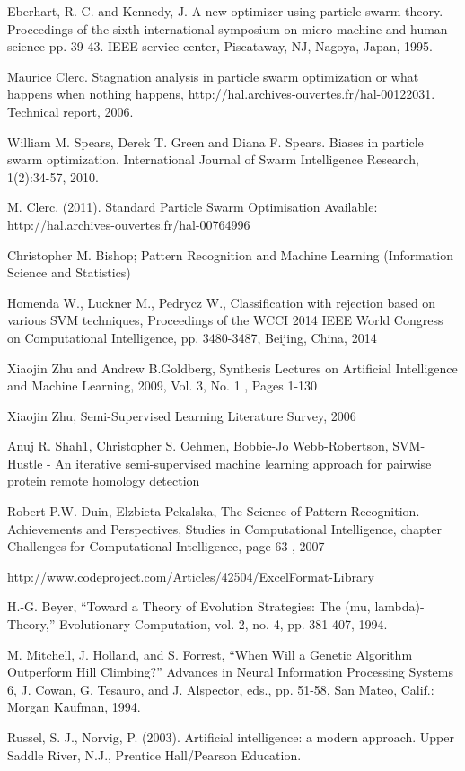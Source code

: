 \documentclass{mini}
\begin{document}
\begin{thebibliography}{1}
    
    Eberhart, R. C. and Kennedy, J. A new optimizer using particle swarm theory. Proceedings of the sixth international symposium on micro machine and human science pp. 39-43. IEEE service center, Piscataway, NJ, Nagoya, Japan, 1995.
    
    Maurice Clerc. Stagnation analysis in particle swarm optimization or what happens when nothing happens, http://hal.archives-ouvertes.fr/hal-00122031. Technical report, 2006.

    William M. Spears, Derek T. Green and Diana F. Spears. Biases in particle swarm optimization. International Journal of Swarm Intelligence Research, 1(2):34-57, 2010.

    M. Clerc. (2011). Standard Particle Swarm Optimisation Available: http://hal.archives-ouvertes.fr/hal-00764996 
    
     Christopher M. Bishop; Pattern Recognition and Machine Learning (Information Science and Statistics)
    
	 Homenda W., Luckner M., Pedrycz W., Classification with rejection based on various SVM techniques, Proceedings of the WCCI 2014 IEEE World Congress on Computational Intelligence, pp. 3480-3487, Beijing, China, 2014     
    
	 Xiaojin Zhu and Andrew B.Goldberg, Synthesis Lectures on Artificial Intelligence and Machine Learning, 2009, Vol. 3, No. 1 , Pages 1-130    
	
     Xiaojin Zhu, Semi-Supervised Learning Literature Survey, 2006

	
	 Anuj R. Shah1, Christopher S. Oehmen, Bobbie-Jo Webb-Robertson, SVM-Hustle - An iterative semi-supervised machine learning approach for pairwise protein remote homology detection 
    
	 Robert P.W. Duin, Elzbieta Pekalska, The Science of Pattern Recognition. Achievements and Perspectives, Studies in Computational Intelligence, chapter Challenges for Computational Intelligence, page 63 , 2007
    
     http://www.codeproject.com/Articles/42504/ExcelFormat-Library
	
     H.-G. Beyer, “Toward a Theory of Evolution Strategies: The (mu, lambda)-Theory,” Evolutionary Computation, vol. 2, no. 4, pp. 381-407, 1994.
    
     M. Mitchell, J. Holland, and S. Forrest, “When Will a Genetic Algorithm Outperform Hill Climbing?” Advances in Neural Information Processing Systems 6, J. Cowan, G. Tesauro, and J. Alspector,
    eds., pp. 51-58, San Mateo, Calif.: Morgan Kaufman, 1994.
    
     Russel, S. J., Norvig, P. (2003). Artificial intelligence: a modern approach. Upper Saddle River, N.J., Prentice Hall/Pearson Education.
    
\end{thebibliography}
\makestatement
\end{document}

